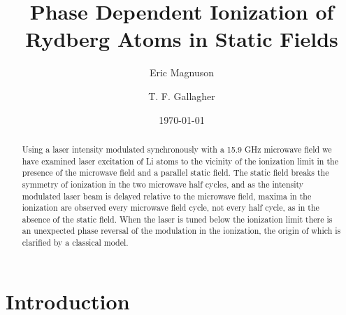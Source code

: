 \documentclass[aps,pra,reprint,groupedaddress]{revtex4-1}
\begin{document}
\title{Phase Dependent Ionization of Rydberg Atoms in Static Fields}
\author{Eric Magnuson}
\author{T. F. Gallagher}
\date{\today}

\begin{abstract}
Using a laser intensity modulated synchronously with a 15.9 GHz microwave field we have examined laser excitation of Li atoms to the vicinity of the ionization limit in the presence of the microwave field and a parallel static field. The static field breaks the symmetry of ionization in the two microwave half cycles, and as the intensity modulated laser beam is delayed relative to the microwave field, maxima in the ionization are observed every microwave field cycle, not every half cycle, as in the absence of the static field. When the laser is tuned below the ionization limit there is an unexpected phase reversal of the modulation in the ionization, the origin of which is clarified by a classical model.
\end{abstract}

\pacs{}

\maketitle

\section{\label{sec:intro}Introduction}
\end{document}
